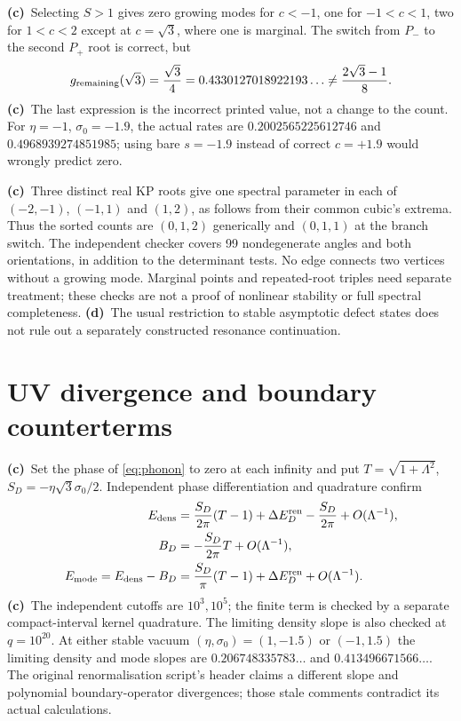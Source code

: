 \documentclass[11pt,a4paper]{article}
\newcommand{\Lc}{\textbf{(c)}\ }
\newcommand{\Ld}{\textbf{(d)}\ }
\begin{document}
\Lc Selecting $S>1$ gives zero growing modes for $c<-1$, one for
$-1<c<1$, two for $1<c<2$ except at $c=\sqrt3$, where one is marginal.
The switch from $P_-$ to the second $P_+$ root is correct, but
\begin{equation}
 g_{\rm remaining}(\sqrt3)=\frac{\sqrt3}{4}
 =0.4330127018922193\ldots\ne\frac{2\sqrt3-1}{8}.
\end{equation}
\Lc The last expression is the incorrect printed value, not a change to the
count. For $\eta=-1$, $\sigma_0=-1.9$, the actual rates are
$0.2002565225612746$ and $0.4968939274851985$; using bare $s=-1.9$
instead of correct $c=+1.9$ would wrongly predict zero.

\Lc Three distinct real KP roots give one spectral parameter in each of
$(-2,-1)$, $(-1,1)$ and $(1,2)$, as follows from their common cubic's extrema.
Thus the sorted counts are $(0,1,2)$ generically and $(0,1,1)$ at the branch
switch. The independent checker covers 99 nondegenerate angles and both
orientations, in addition to the determinant tests. No edge connects two
vertices without a growing mode. Marginal points and repeated-root triples
need separate treatment; these checks are not a proof of nonlinear stability
or full spectral completeness. \Ld The usual restriction to stable
asymptotic defect states does not rule out a separately constructed resonance
continuation.

\section{UV divergence and boundary counterterms}
\Lc Set the phase of \eqref{eq:phonon} to zero at each infinity and put
$T=\sqrt{1+\Lambda^2}$, $S_D=-\eta\sqrt3\sigma_0/2$. Independent phase
differentiation and quadrature confirm
\begin{align}
 E_{\rm dens}&=\frac{S_D}{2\pi}(T-1)+\Delta E_D^{\rm ren}
                                  -\frac{S_D}{2\pi}+O(\Lambda^{-1}),\\
 B_D&=-\frac{S_D}{2\pi}T+O(\Lambda^{-1}),\\
 E_{\rm mode}=E_{\rm dens}-B_D
 &=\frac{S_D}{\pi}(T-1)+\Delta E_D^{\rm ren}+O(\Lambda^{-1}).
\end{align}
\Lc The independent cutoffs are $10^3,10^5$; the finite term is checked by a
separate compact-interval kernel quadrature. The limiting density slope is
also checked at $q=10^{20}$. At either stable vacuum
$(\eta,\sigma_0)=(1,-1.5)$ or $(-1,1.5)$ the limiting density and mode slopes
are $0.206748335783\ldots$ and $0.413496671566\ldots$.
The original renormalisation script's header claims a different slope and
polynomial boundary-operator divergences; those stale comments contradict
its actual calculations.
\end{document}

